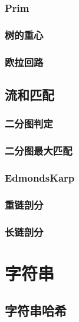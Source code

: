 \subsubsection{Prim}


\subsubsection{树的重心}


\subsubsection{欧拉回路}

\subsection{流和匹配}
\subsubsection{二分图判定}


\subsubsection{二分图最大匹配}


\subsubsection{EdmondsKarp}


\subsubsection{重链剖分}


\subsubsection{长链剖分}

\section{字符串}
\subsection{字符串哈希}


